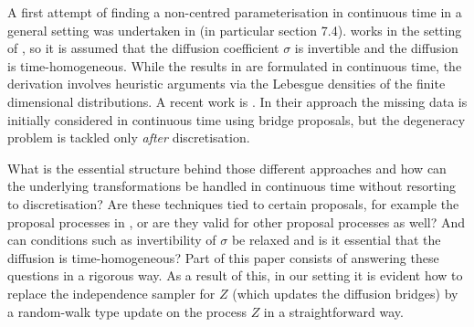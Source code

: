 \documentclass[preprint]{imsart}
\newcommand{\si}{\sigma}
\theoremstyle{definition}
\begin{document}
 A first attempt of finding a non-centred parameterisation in continuous time in a  general setting   was undertaken in \cite{Fuchs} (in particular section 7.4).
 \cite{Fuchs} works in the setting of \cite{DelyonHu}, so it is assumed that the diffusion coefficient $\si$ is invertible and the diffusion is time-homogeneous. While the results in \cite{Fuchs} are formulated in continuous time, the derivation involves heuristic arguments via the Lebesgue densities of the finite dimensional distributions. 
 A recent work is \cite{PapaRobertsStramer}. In their approach the missing data is initially considered in continuous time using \cite{DelyonHu} bridge proposals, but the degeneracy problem is tackled only {\it after} discretisation. 
 
What is the essential structure behind those different approaches and how can the underlying transformations be handled in continuous time without resorting to discretisation? Are these techniques tied to certain proposals, for example the proposal processes in \cite{DelyonHu},
 or are they valid for other proposal processes as well? And can conditions such as invertibility of $\sigma$ be relaxed and is it essential that the diffusion is time-homogeneous? Part of this paper consists of answering these questions in a rigorous way. As a result of this, in our setting it is evident how to replace the independence sampler for $Z$ (which updates the diffusion bridges) by  a random-walk type update on the process $Z$ in a straightforward way. 
\end{document}
